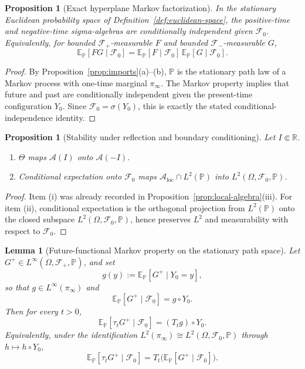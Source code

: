 \documentclass[11pt]{article}
\newtheorem{proposition}[theorem]{Proposition}
\newtheorem{lemma}[theorem]{Lemma}
\theoremstyle{definition}
\theoremstyle{remark}
\newcommand{\R}{\mathbb R}
\newcommand{\E}{\mathbb E}
\newcommand{\mcA}{\mathcal A}
\newcommand{\mcF}{\mathcal F}
\begin{document}
\begin{proposition}[Exact hyperplane Markov factorization]
\label{prop:hyperplane-factorization}
In the stationary Euclidean probability space of
Definition~\ref{def:euclidean-space}, the positive-time and negative-time
sigma-algebras are conditionally independent given \(\mcF_0\).  Equivalently,
for bounded \(\mcF_+\)-measurable \(F\) and bounded \(\mcF_-\)-measurable \(G\),
\[
\E_{\mathbb P}[FG\mid\mcF_0]
=
\E_{\mathbb P}[F\mid\mcF_0]\,
\E_{\mathbb P}[G\mid\mcF_0].
\]
\end{proposition}

\begin{proof}
By Proposition~\ref{prop:imports}\textnormal{(a)--(b)}, \(\mathbb P\) is the
stationary path law of a Markov process with one-time marginal \(\pi_\infty\).
The Markov property implies that future and past are conditionally independent
given the present-time configuration \(Y_0\).  Since
\(\mcF_0=\sigma(Y_0)\), this is exactly the stated conditional-independence
identity.
\end{proof}

\begin{proposition}[Stability under reflection and boundary conditioning]
\label{prop:reflection-stability}
Let \(I\Subset\R\).
\begin{enumerate}[label=\textnormal{(\roman*)},leftmargin=1.5em]
\item \(\Theta\) maps \(\mcA(I)\) onto \(\mcA(-I)\).
\item Conditional expectation onto \(\mcF_0\) maps
\(\mcA_{\mathrm{loc}}\cap L^2(\mathbb P)\) into \(L^2(\Omega,\mcF_0,\mathbb P)\).
\end{enumerate}
\end{proposition}

\begin{proof}
Item \textnormal{(i)} was already recorded in
Proposition~\ref{prop:local-algebra}\textnormal{(iii)}.  For
item \textnormal{(ii)}, conditional expectation is the orthogonal projection
from \(L^2(\mathbb P)\) onto the closed subspace
\(L^2(\Omega,\mcF_0,\mathbb P)\), hence preserves \(L^2\) and measurability
with respect to \(\mcF_0\).
\end{proof}

\begin{lemma}[Future-functional Markov property on the stationary path space]
\label{lem:future-markov}
Let \(G^+\in L^\infty(\Omega,\mcF_+,\mathbb P)\), and set
\[
g(y):=\E_{\mathbb P}[G^+\mid Y_0=y],
\]
so that \(g\in L^\infty(\pi_\infty)\) and
\[
\E_{\mathbb P}[G^+\mid\mcF_0]=g\circ Y_0.
\]
Then for every \(t>0\),
\[
\E_{\mathbb P}[\tau_t G^+\mid\mcF_0]
=
(T_t g)\circ Y_0.
\]
Equivalently, under the identification
\(L^2(\pi_\infty)\cong L^2(\Omega,\mcF_0,\mathbb P)\) through
\(h\mapsto h\circ Y_0\),
\[
\E_{\mathbb P}[\tau_t G^+\mid\mcF_0]
=
T_t\!\bigl(\E_{\mathbb P}[G^+\mid\mcF_0]\bigr).
\]
\end{lemma}
\end{document}
